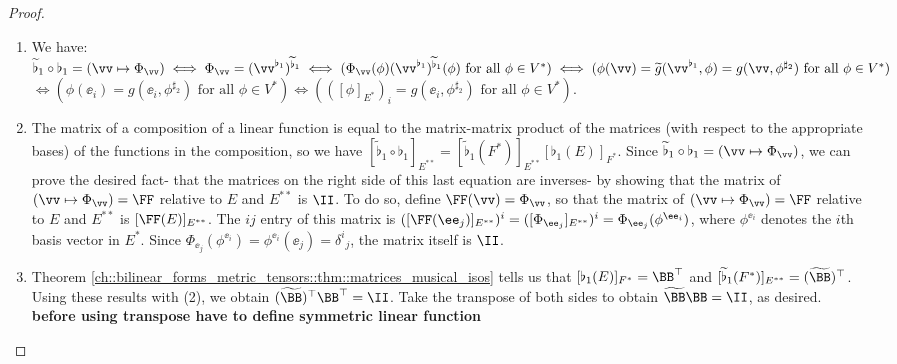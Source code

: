 \begin{proof}
    \hspace{0mm} \\
    \begin{enumerate}
        \item We have: $\widetilde{\flat}_1 \circ \flat_1 = (\vv \mapsto \Phi_\vv) \iff  \Phi_\vv = (\vv^{\flat_1})^{\widetilde{\flat}_1} \iff
        (\Phi_\vv(\phi) (\vv^{\flat_1})^{\widetilde{\flat}_1}(\phi) \text{ for all $\phi \in V^*$}) \\ \iff
        (\phi(\vv) = \widetilde{g}(\vv^{\flat_1}, \phi) = g(\vv, \phi^{\sharp_2}) \text{ for all $\phi \in V^*$})$ \\ $\iff (\phi(\ee_i) = g(\ee_i, \phi^{\sharp_2}) \text{ for all $\phi \in V^*$}) \iff (([\phi]_{E^*})_i = g(\ee_i, \phi^{\sharp_2}) \text{ for all $\phi \in V^*$})$.
        
        \item The matrix of a composition of a linear function is equal to the matrix-matrix product of the matrices (with respect to the appropriate bases) of the functions in the composition, so we have $[\widetilde{\flat}_1 \circ \flat_1]_{E^{**}} = [\widetilde{\flat}_1(F^*)]_{E^{**}} [\flat_1(E)]_{F^*}$. Since $\widetilde{\flat}_1 \circ \flat_1 = (\vv \mapsto \Phi_\vv)$, we can prove the desired fact- that the matrices on the right side of this last equation are inverses- by showing that the matrix of $(\vv \mapsto \Phi_\vv) = \FF$ relative to $E$ and $E^{**}$ is $\II$. To do so, define $\FF(\vv) = \Phi_\vv$, so that the matrix of $(\vv \mapsto \Phi_\vv) = \FF$ relative to $E$ and $E^{**}$ is $[\FF(E)]_{E^{**}}$. The $ij$ entry of this matrix is $([\FF(\ee_j)]_{E^{**}})^i = ([\Phi_{\ee_j}]_{E^{**}})^i = \Phi_{\ee_j}(\phi^{\ee_i})$, where $\phi^{\ee_i}$ denotes the $i$th basis vector in $E^*$. Since $\Phi_{\ee_j}(\phi^{\ee_i}) = \phi^{\ee_i}(\ee_j) = \delta^i{}_j$, the matrix itself is $\II$.
        \item Theorem \ref{ch::bilinear_forms_metric_tensors::thm::matrices_musical_isos} tells us that $[\flat_1(E)]_{F^*} = \BB^\top$ and $[\widetilde{\flat}_1(F^*)]_{E^{**}} = (\widetilde{\BB})^\top$. Using these results with (2), we obtain $(\widetilde{\BB})^\top \BB^\top = \II$. Take the transpose of both sides to obtain $\widetilde{\BB} \BB = \II$, as desired. \textbf{before using transpose have to define symmetric linear function}
    \end{enumerate}
\end{proof}
 
